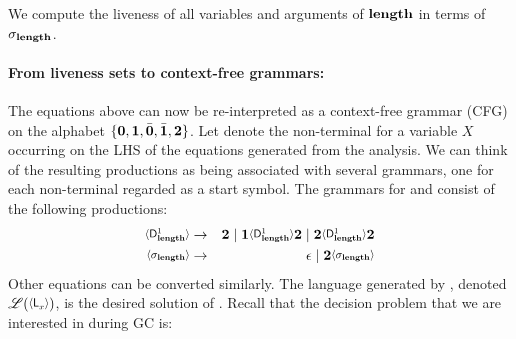 \documentclass[9pt,nonatbib]{sigplanconf}
\newcommand{\added}[1]{#1}
\begin{document}
We compute the liveness of all variables and arguments of $\mathbf{length}$ in terms of $\sigma_{\mathbf{length}}$.

\paragraph{From liveness sets to context-free grammars:}\label{sec:grammar-formulation}      
The  equations  above can  now  be  re-interpreted as  a  context-free
grammar  (CFG) on  the  alphabet $\lbrace\mathbf{0},  \mathbf{1}, \bar{\mathbf{0}},  \bar{\mathbf{1}},
{\mathbf{2}}\rbrace$.  Let  denote  the non-terminal for a variable
$X$ occurring on the LHS of the equations generated from the analysis.
We can  think of  the resulting productions  as being  associated with
several grammars, one for  each non-terminal  regarded
as a start  symbol. \added{The grammars for   and \var{\sigma_{\length}} consist of the following productions}:
\begin{eqnarray*}
  \var{\Df{\length}{1}} &\rightarrow& \clazy \mid
  \acdr\var{\Df{\length}{1}}\clazy
       \mid \clazy\var{\Df{\length}{1}}{\clazy}\\
\var{\sigma_{\length}}
&\rightarrow&
\epsilon  \mid \clazy\var{\sigma_{\length}}
\end{eqnarray*}
Other  equations  can   be  converted  similarly.   The
language   generated   by  ,   denoted
$\mathscr{L}(\var{\Lanv{x}{}})$,   is    the   desired
solution  of  .    
Recall that the decision problem that we are interested in
during GC is: 
\end{document}
